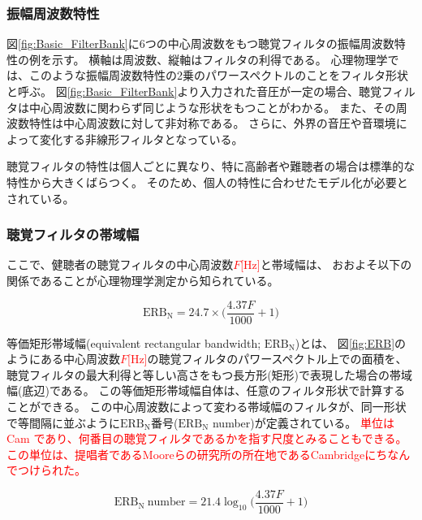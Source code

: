 \subsubsection{振幅周波数特性}
図\ref{fig:Basic_FilterBank}に6つの中心周波数をもつ聴覚フィルタの振幅周波数特性の例を示す。
横軸は周波数、縦軸はフィルタの利得である。
心理物理学では、このような振幅周波数特性の2乗のパワースペクトルのことをフィルタ形状と呼ぶ。
図\ref{fig:Basic_FilterBank}より入力された音圧が一定の場合、聴覚フィルタは中心周波数に関わらず同じような形状をもつことがわかる。
また、その周波数特性は中心周波数に対して非対称である。
さらに、外界の音圧や音環境によって変化する非線形フィルタとなっている。

聴覚フィルタの特性は個人ごとに異なり、特に高齢者や難聴者の場合は標準的な特性から大きくばらつく。
そのため、個人の特性に合わせたモデル化が必要とされている。

\subsubsection{聴覚フィルタの帯域幅}
ここで、健聴者の聴覚フィルタの中心周波数\textcolor{red}{$F$[Hz]}と帯域幅は、
おおよそ以下の関係であることが心理物理学測定から知られている\cite{moore2013introduction}。

\begin{equation}
	\mathrm{ERB_N} = 24.7 \times\bigl(\frac{4.37F}{1000} + 1\bigr)
    \label{eq:ERB}
\end{equation}

等価矩形帯域幅(equivalent rectangular bandwidth; $\mathrm{ERB_N}$)とは、
図\ref{fig:ERB}のようにある中心周波数\textcolor{red}{$F$[Hz]}の聴覚フィルタのパワースペクトル上での面積を、
聴覚フィルタの最大利得と等しい高さをもつ長方形(矩形)で表現した場合の帯域幅(底辺)である。
この等価矩形帯域幅自体は、任意のフィルタ形状で計算することができる。
この中心周波数によって変わる帯域幅のフィルタが、同一形状で等間隔に並ぶように$\mathrm{ERB_N}$番号($\mathrm{ERB_N}$ number)が定義されている。%
\textcolor{red}{
    単位はCam であり、何番目の聴覚フィルタであるかを指す尺度とみることもできる\cite{unoki2021Method}。
    この単位は、提唱者であるMooreらの研究所の所在地であるCambridgeにちなんでつけられた\cite{hartmann2004Signal}。 
}

\begin{equation}
    \mathrm{ERB_N \ number} = 21.4 \log_{10} \bigl(\frac{4.37F}{1000} + 1\bigr)
\end{equation}

